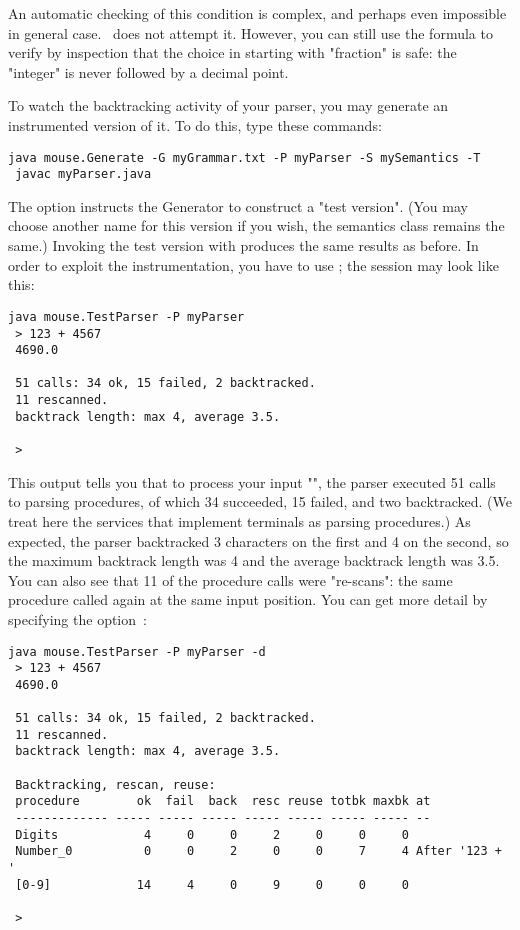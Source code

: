 An automatic checking of this condition is complex, and perhaps even impossible
in general case. 
\Mouse\ does not attempt it.
However,
you can still use the formula to verify by inspection that the choice in 
starting with "fraction"
is safe: the "integer" is never followed by a decimal point.

To watch the backtracking activity of your parser,
you may generate an instrumented version of it.
To do this, type these commands:

\small
\begin{Verbatim}[samepage=true,xleftmargin=15mm,baselinestretch=0.8]
 java mouse.Generate -G myGrammar.txt -P myParser -S mySemantics -T
 javac myParser.java
\end{Verbatim}
\normalsize

The option  instructs the Generator to construct a "test version".
(You may choose another name for this version if you wish,
the semantics class remains the same.)
Invoking the test version with 
produces the same results as before.
In order to exploit the instrumentation, you have to use ;
the session may look like this:

\small
\begin{Verbatim}[samepage=true,xleftmargin=15mm,baselinestretch=0.8]
 java mouse.TestParser -P myParser
 > 123 + 4567
 4690.0

 51 calls: 34 ok, 15 failed, 2 backtracked.
 11 rescanned.
 backtrack length: max 4, average 3.5.

 >
\end{Verbatim}
\normalsize

This output tells you that to process your input "",
the parser executed 51 calls to parsing procedures,
of which 34 succeeded, 15 failed, and two backtracked.
(We treat here the services that implement terminals as parsing procedures.)
As expected, the parser backtracked 3 characters on the first 
and 4 on the second, so the maximum backtrack length was 4 
and the average backtrack length was 3.5.
You can also see that 11 of the procedure calls were "re-scans":
the same procedure called again at the same input position.
You can get more detail by specifying the option~:

\small
\begin{Verbatim}[samepage=true,xleftmargin=15mm,baselinestretch=0.8]
 java mouse.TestParser -P myParser -d
 > 123 + 4567   
 4690.0

 51 calls: 34 ok, 15 failed, 2 backtracked.
 11 rescanned.
 backtrack length: max 4, average 3.5.
 
 Backtracking, rescan, reuse:
 procedure        ok  fail  back  resc reuse totbk maxbk at             
 ------------- ----- ----- ----- ----- ----- ----- ----- --             
 Digits            4     0     0     2     0     0     0
 Number_0          0     0     2     0     0     7     4 After '123 + ' 
 [0-9]            14     4     0     9     0     0     0
 
 >
\end{Verbatim}
\normalsize


